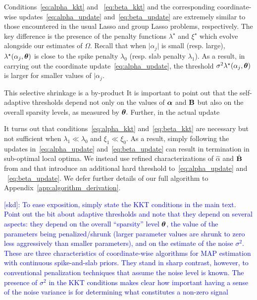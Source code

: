 Conditions~\eqref{eq:alpha_kkt} and ~\eqref{eq:beta_kkt} and the corresponding coordinate-wise updates~\eqref{eq:alpha_update} and~\eqref{eq:beta_update} are extremely similar to those encountered in the usual Lasso and group Lasso problems, respectively.
The key difference is the presence of the penalty functions $\lambda^{\star}$ and $\xi^{\star}$ which evolve alongside our estimates of $\Omega.$
Recall that when $\lvert \alpha_{j} \rvert$ is small (resp. large), $\lambda^{\star}(\alpha_{j},\boldsymbol{\theta})$ is close to the spike penalty $\lambda_{0}$ (resp. slab penalty $\lambda_{1}$).
As a result, in carrying out the coordinate update~\eqref{eq:alpha_update}, the threshold $\sigma^{2}\lambda^{\star}(\alpha_{j},\boldsymbol{\theta})$ is larger for smaller values of $\vert \alpha_{j}.$

This selective shrinkage is a by-product 
It is important to point out that the self-adaptive thresholds depend not only on the values of $\boldsymbol{\alpha}$ and $\mathbf{B}$ but also on the overall sparsity levels, as measured by $\boldsymbol{\theta}.$
Further, in the actual update

It turns out that conditions~\eqref{eq:alpha_kkt} and~\eqref{eq:beta_kkt} are necessary but not sufficient when $\lambda_{1} \ll \lambda_{0}$ and $\xi_{1} \ll \xi_{0}.$
As a result, simply following the updates in~\eqref{eq:alpha_update} and~\eqref{eq:beta_update} can result in termination in sub-optimal local optima. 
We instead use refined characterizations of $\hat{\alpha}$ and $\hat{\mathbf{B}}$ from \citet{RockovaGeorge2018} and \citet{Bai2020} that introduce an additional hard threshold to~\eqref{eq:alpha_update} and ~\eqref{eq:beta_update}.
We defer further details of our full algorithm to Appendix~\ref{app:algorithm_derivation}. 

\textcolor{blue}{[skd]: To ease exposition, simply state the KKT conditions in the main text. Point out the bit about adaptive thresholds and note that they depend on several aspects: they depend on the overall ``sparsity'' level $\boldsymbol{\theta}$, the value of the parameters being penalized/shrunk (larger parameter values are shrunk to zero less aggressively than smaller parameters), and on the estimate of the noise $\sigma^{2}.$ These are three characteristics of coordinate-wise algorithms for MAP estimation with continuous spike-and-slab priors. They stand in sharp contrast, however, to conventional penalization techniques that assume the noise level is known. The presence of $\sigma^{2}$ in the KKT conditions makes clear how important having a sense of the noise variance is for determining what constitutes a non-zero signal} 


